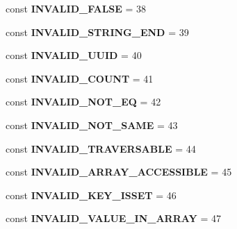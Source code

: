 \begin{DoxyCompactItemize}
const {\bfseries I\+N\+V\+A\+L\+I\+D\+\_\+\+F\+A\+L\+SE} = 38
\item 
\mbox{\label{class_assert_1_1_assertion_a78b86fc17ff6546180bb2d7c2f16bcc0}} 
const {\bfseries I\+N\+V\+A\+L\+I\+D\+\_\+\+S\+T\+R\+I\+N\+G\+\_\+\+E\+ND} = 39
\item 
\mbox{\label{class_assert_1_1_assertion_afd06f5736e48c7955afddc9b265b69bf}} 
const {\bfseries I\+N\+V\+A\+L\+I\+D\+\_\+\+U\+U\+ID} = 40
\item 
\mbox{\label{class_assert_1_1_assertion_af23a9b25226b5d4b1c7bc92fe22fadd3}} 
const {\bfseries I\+N\+V\+A\+L\+I\+D\+\_\+\+C\+O\+U\+NT} = 41
\item 
\mbox{\label{class_assert_1_1_assertion_a4a80b6b3399b0eaadae10c038f463968}} 
const {\bfseries I\+N\+V\+A\+L\+I\+D\+\_\+\+N\+O\+T\+\_\+\+EQ} = 42
\item 
\mbox{\label{class_assert_1_1_assertion_afa6fd7f0b9a408ba66998a053aa3328c}} 
const {\bfseries I\+N\+V\+A\+L\+I\+D\+\_\+\+N\+O\+T\+\_\+\+S\+A\+ME} = 43
\item 
\mbox{\label{class_assert_1_1_assertion_aae53c1c288a6d346e7c582c582993292}} 
const {\bfseries I\+N\+V\+A\+L\+I\+D\+\_\+\+T\+R\+A\+V\+E\+R\+S\+A\+B\+LE} = 44
\item 
\mbox{\label{class_assert_1_1_assertion_a12fa30a788c45e7dcf97f257c210e40a}} 
const {\bfseries I\+N\+V\+A\+L\+I\+D\+\_\+\+A\+R\+R\+A\+Y\+\_\+\+A\+C\+C\+E\+S\+S\+I\+B\+LE} = 45
\item 
\mbox{\label{class_assert_1_1_assertion_a177cbc3681807e592b3d882dd3f06ed4}} 
const {\bfseries I\+N\+V\+A\+L\+I\+D\+\_\+\+K\+E\+Y\+\_\+\+I\+S\+S\+ET} = 46
\item 
\mbox{\label{class_assert_1_1_assertion_a6df4f675db237f016b190c32ba5c0fdf}} 
const {\bfseries I\+N\+V\+A\+L\+I\+D\+\_\+\+V\+A\+L\+U\+E\+\_\+\+I\+N\+\_\+\+A\+R\+R\+AY} = 47
\item 
\mbox{\label{class_assert_1_1_assertion_a710966feb71808c0d46e42e6b8ca1db9}} 

\end{DoxyCompactItemize}
